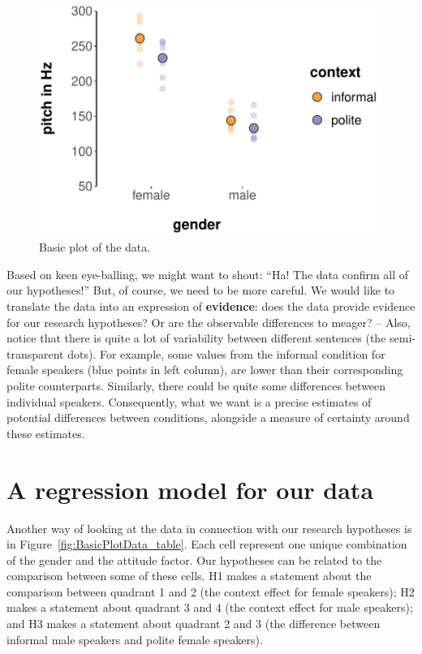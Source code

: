 \documentclass[nobib]{tufte-handout}
\begin{document}
\begin{figure}[t]
  \centering
    \includegraphics[width = \textwidth]{pics/basic_data_plot.pdf}
    \caption{Basic plot of the data.}
     \label{fig:BasicPlotData_data}
\end{figure}

Based on keen eye-balling, we might want to shout: ``Ha! The data confirm all of our
hypotheses!'' But, of course, we need to be more careful. We would like to translate the data
into an expression of \textbf{evidence}: does the data provide evidence for our research
hypotheses? Or are the observable differences to meager? -- Also, notice that there is quite a
lot of variability between different sentences (the semi-transparent dots). For example, some
values from the informal condition for female speakers (blue points in left column), are lower
than their corresponding polite counterparts. Similarly, there could be quite some differences
between individual speakers. Consequently, what we want is a precise estimates of potential
differences between conditions, alongside a measure of certainty around these estimates.


\section{A regression model for our data}

Another way of looking at the data in connection with our research hypotheses is in Figure~\ref{fig:BasicPlotData_table}. Each cell represent one unique combination of the gender and the attitude factor.
Our hypotheses can be related to the comparison between some of these cells.
H1 makes a statement about the comparison between quadrant 1 and 2 (the context effect for female speakers); H2 makes a statement about quadrant 3 and 4 (the context effect for male speakers); and H3 makes a statement about quadrant 2 and 3 (the difference between informal male speakers and polite female speakers).
\end{document}
